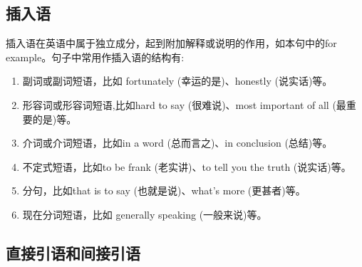 \subsection{插入语}

插入语在英语中属于独立成分，起到附加解释或说明的作用，如本句中的for example。句子中常用作插入语的结构有:
\begin{enumerate}
  \item 副词或副词短语，比如 fortunately (幸运的是)、honestly (说实话)等。
  \item 形容词或形容词短语,比如hard to say (很难说)、most important of all (最重要的是)等。
  \item 介词或介词短语，比如in a word (总而言之)、in conclusion (总结)等。
  \item 不定式短语，比如to be frank (老实讲)、to tell you the truth (说实话)等。
  \item 分句，比如that is to say (也就是说)、what's more (更甚者)等。
  \item 现在分词短语，比如 generally speaking (一般来说)等。
\end{enumerate}

\subsection{直接引语和间接引语}

